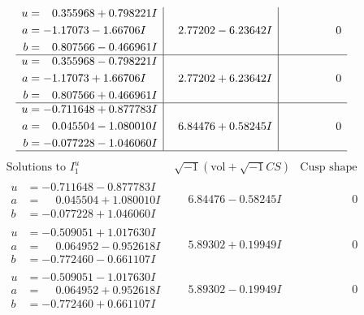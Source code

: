 \documentclass[1p]{elsarticle_modified}
\theoremstyle{definition}
\newcommand{\I}{\sqrt{-1}}
\begin{document}
$$\begin{array}{c|c|c}
\begin{aligned}
u &= \phantom{-}0.355968 + 0.798221 I \\
a &= -1.17073 - 1.66706 I \\
b &= \phantom{-}0.807566 - 0.466961 I\end{aligned}
 & \phantom{-}2.77202 - 6.23642 I & \phantom{-0.000000 } 0 \\ \hline\begin{aligned}
u &= \phantom{-}0.355968 - 0.798221 I \\
a &= -1.17073 + 1.66706 I \\
b &= \phantom{-}0.807566 + 0.466961 I\end{aligned}
 & \phantom{-}2.77202 + 6.23642 I & \phantom{-0.000000 } 0 \\ \hline\begin{aligned}
u &= -0.711648 + 0.877783 I \\
a &= \phantom{-}0.045504 - 1.080010 I \\
b &= -0.077228 - 1.046060 I\end{aligned}
 & \phantom{-}6.84476 + 0.58245 I & \phantom{-0.000000 } 0\\
 \hline 
 \end{array}$$\newpage$$\begin{array}{c|c|c}  
\text{Solutions to }I^u_{1}& \I (\text{vol} + \sqrt{-1}CS) & \text{Cusp shape}\\
 \hline 
\begin{aligned}
u &= -0.711648 - 0.877783 I \\
a &= \phantom{-}0.045504 + 1.080010 I \\
b &= -0.077228 + 1.046060 I\end{aligned}
 & \phantom{-}6.84476 - 0.58245 I & \phantom{-0.000000 } 0 \\ \hline\begin{aligned}
u &= -0.509051 + 1.017630 I \\
a &= \phantom{-}0.064952 - 0.952618 I \\
b &= -0.772460 - 0.661107 I\end{aligned}
 & \phantom{-}5.89302 + 0.19949 I & \phantom{-0.000000 } 0 \\ \hline\begin{aligned}
u &= -0.509051 - 1.017630 I \\
a &= \phantom{-}0.064952 + 0.952618 I \\
b &= -0.772460 + 0.661107 I\end{aligned}
 & \phantom{-}5.89302 - 0.19949 I & \phantom{-0.000000 } 0 \\ \hline\begin{aligned}

\end{aligned}
\end{array}$$
\end{document}
